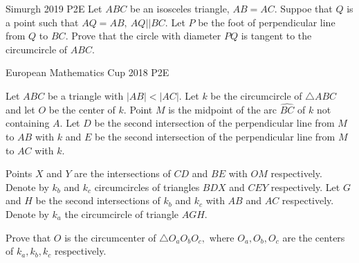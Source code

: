 \prob{}
{Simurgh 2019 P2}{E}{
    Let $ ABC $ be an isosceles triangle, $ AB=AC $.
    Suppoe that $ Q $ is a point such that $ AQ=AB,\ AQ||BC $. Let $ P $ be the
    foot of perpendicular line from $ Q $ to $ BC $. Prove that the circle with
    diameter $ PQ $ is tangent to the circumcircle of $ ABC $.
}



{European Mathematics Cup 2018 P2}{E}{
    Let $ABC$ be a triangle with $|AB|<|AC|$. Let $k$ be the circumcircle
    of $\triangle ABC$ and let $O$ be the center of $k$. Point $M$ is the
    midpoint of the arc $\widehat{BC}$ of $k$ not containing $A$. Let $D$ be
    the second intersection of the perpendicular line from $M$ to $AB$ with
    $k$ and $E$ be the second intersection of the perpendicular line from $M$
    to $AC$ with $k$. 

    Points $X$ and $Y$ are the intersections of $CD$ and
    $BE$ with $OM$ respectively. Denote by $k_{b}$ and $k_{c}$ circumcircles
    of triangles $BDX$ and $CEY$ respectively. Let $G$ and $H$ be the
    second intersections of $k_{b}$ and $k_{c}$ with $AB$ and $AC$
    respectively. Denote by $k_{a}$ the circumcircle of triangle $AGH$.

    Prove that $O$ is the circumcenter of $\triangle O_{a}O_{b}O_{c},$ where
    $O_{a}, O_{b}, O_{c}$ are the centers of $k_{a}, k_{b}, k_{c}$
    respectively.
}





